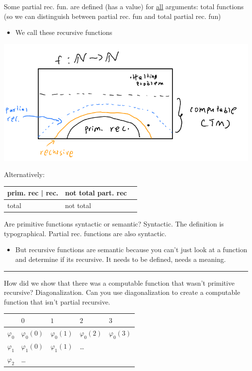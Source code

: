 \documentclass[11pt]{article}
\begin{document}
Some partial rec. fun. are defined (has a value) for \uline{all} arguments: total functions (so we can distinguish between partial rec. fun and total partial rec. fun)
\begin{itemize}
\item We call these recursive functions
\end{itemize}
\begin{center}
\includegraphics[width=.9\linewidth]{./Images/i29.png}
\end{center}

Alternatively: 
\begin{tabular}{l l | l}
prim. rec | rec. & not total part. rec
\\ \hline total & not total
\end{tabular}
Are primitive functions syntactic or semantic? Syntactic. The definition is typographical. Partial rec. functions are also syntactic.
\begin{itemize}
\item But recursive functions are semantic because you can't just look at a function and determine if its recursive. It needs to be defined, needs a meaning.
\end{itemize}

\noindent\rule{\textwidth}{0.5pt}
How did we show that there was a computable function that wasn't primitive recursive? Diagonalization. Can you use diagonalization to create a computable function that isn't partial recursive.
\begin{center}
\begin{tabular}{lllll}
 & \(0\) & \(1\) & \(2\) & \(3\)\\
\hline
\(\varphi_0\) & \(\varphi_0(0)\) & \(\varphi_0(1)\) & \(\varphi_0(2)\) & \(\varphi_0(3)\)\\
\(\varphi_1\) & \(\varphi_1(0)\) & \(\varphi_1(1)\) & \ldots & \\
\(\varphi_2\) & \ldots &  &  & \\
\end{tabular}
\end{center}
\end{document}
